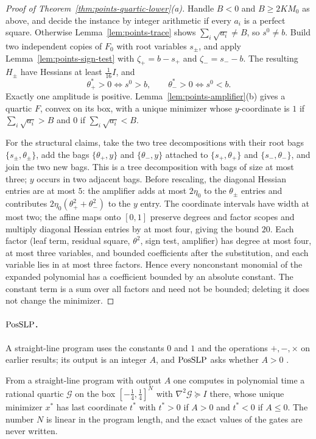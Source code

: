 \begin{proof}[Proof of Theorem~\ref{thm:points-quartic-lower}(a)]
Handle $B<0$ and $B\ge2KM_0$ as above, and decide the instance by integer
arithmetic if every $a_i$ is a perfect square. Otherwise
Lemma~\ref{lem:points-trace} shows $\sum_i\sqrt{a_i}\ne B$, so $s^0\ne b$.
Build two independent copies of $F_0$ with root variables $s_\pm$, and apply
Lemma~\ref{lem:points-sign-test} with $\zeta_+=b-s_+$ and $\zeta_-=s_--b$.
The resulting $H_\pm$ have Hessians at least $\frac1{16}I$, and
\[
 \theta_+^*>0\iff s^0>b,\qquad\theta_-^*>0\iff s^0<b .
\]
Exactly one amplitude is positive. Lemma~\ref{lem:points-amplifier}(b)
gives a quartic $F$, convex on its box, with a unique minimizer whose
$y$-coordinate is $1$ if $\sum_i\sqrt{a_i}>B$ and $0$ if
$\sum_i\sqrt{a_i}<B$.

For the structural claims, take the two tree decompositions with their
root bags $\{s_\pm,\theta_\pm\}$, add the bags $\{\theta_+,y\}$ and
$\{\theta_-,y\}$ attached to $\{s_+,\theta_+\}$ and $\{s_-,\theta_-\}$, and
join the two new bags. This is a tree decomposition with bags of size at
most three; $y$ occurs in two adjacent bags. Before rescaling, the diagonal
Hessian entries are at most $5$: the amplifier adds at most $2\eta_0$ to the
$\theta_\pm$ entries and contributes $2\eta_0(\theta_+^2+\theta_-^2)$ to the
$y$ entry. The coordinate intervals have width at most two; the affine maps
onto $[0,1]$ preserve degrees and factor scopes and multiply diagonal Hessian
entries by at most four, giving the bound $20$. Each factor (leaf term,
residual square, $\theta^2$, sign test, amplifier) has degree at most four,
at most three variables, and bounded coefficients after the substitution,
and each variable lies in at most three factors. Hence every nonconstant
monomial of the expanded polynomial has a coefficient bounded by an
absolute constant. The constant term is a sum over all factors and need not
be bounded; deleting it does not change the minimizer.
\end{proof}

\paragraph{$\mathrm{PosSLP}$.}
A straight-line program uses the constants $0$ and $1$ and the operations
$+,-,\times$ on earlier results; its output is an integer $A$, and $\mathrm{PosSLP}$
asks whether $A>0$ \citep{AllenderEtAl2009}.

\begin{lemma}\label{lem:points-gates}
From a straight-line program with output $A$ one computes in polynomial time
a rational quartic $\mathcal G$ on the box $[-\frac14,\frac14]^N$ with
$\nabla^2\mathcal G\succeq I$ there, whose unique minimizer $x^*$ has last
coordinate $t^*$ with $t^*>0$ if $A>0$ and $t^*<0$ if $A\le0$. The number
$N$ is linear in the program length, and the exact values of the gates are
never written.
\end{lemma}

